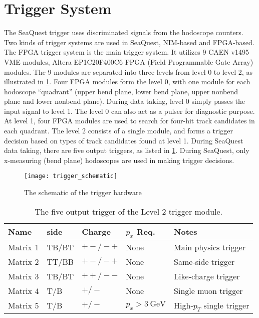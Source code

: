 \documentclass[../main.tex]{subfiles}
\begin{document}
\section{Trigger System}
The SeaQuest trigger uses discriminated signals from the hodoscope counters.
Two kinds of trigger systems are used in SeaQuest, NIM-based and FPGA-based.
The FPGA trigger system is the main trigger system. It utilizes 9 CAEN
v1495 VME modules, Altera EP1C20F400C6 FPGA (Field Programmable Gate Array)
modules. The 9 modules are separated into three levels from level 0 to level
2, as illustrated in \cref{fig:trigger}.
Four FPGA modules form the level 0, with one module for each hodoscope
``quadrant'' (upper bend plane, lower bend plane, upper nonbend plane and
lower nonbend plane). During data taking, level 0 simply passes the input signal
to level 1. The level 0 can also act as a pulser for diagnostic purpose.
At level 1, four FPGA modules are used to search for four-hit track
candidates in each quadrant. The level 2 consists of a single module, and forms
a trigger decision based on types of track candidates found at level 1. During
SeaQuest data taking, there are five output triggers, as listed in \cref{tab:FPGA}.
During SeaQuest, only x-measuring (bend plane) hodoscopes are used in making
trigger decisions.
\begin{figure}
	\centering
	\texttt{[image: trigger\_schematic]}
	\caption{The schematic of the trigger hardware}
	\label{fig:trigger}
\end{figure}
\begin{table}[h!]
	\centering
	\caption{The five output trigger of the Level 2 trigger module.}
	\label{tab:FPGA}
	\begin{tabular}{lllll}
		Name     & side  & Charge  & $p_x$ Req.         & Notes                     \\ \hline
		Matrix 1 & TB/BT & $+-/-+$ & None               & Main physics trigger      \\
		Matrix 2 & TT/BB & $+-/-+$ & None               & Same-side trigger         \\
		Matrix 3 & TB/BT & $++/--$ & None               & Like-charge trigger       \\
		Matrix 4 & T/B   & $+/-$   & None               & Single muon trigger       \\
		Matrix 5 & T/B   & $+/-$   & $p_x>\SI{3}{\GeV}$ & High-$p_T$ single trigger \\ \hline
	\end{tabular}
\end{table}
\end{document}
